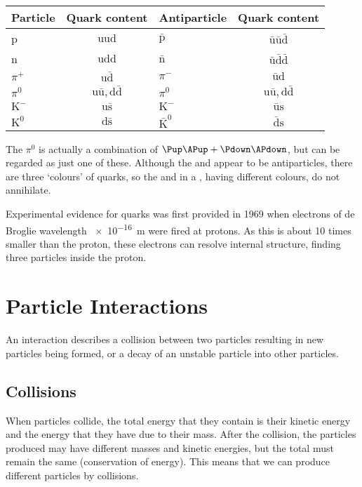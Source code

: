 \documentclass[a4paper,12pt]{article}
\begin{document}
\noindent \begin{tabular}{lclc}
\hline
\hline
Particle & Quark content & Antiparticle & Quark content \\
\hline
p & $\mathrm{u}\mathrm{u}\mathrm{d}$ & $\bar{\mathrm{p}}$ & $\bar{\mathrm{u}}\bar{\mathrm{u}}\bar{\mathrm{d}}$ \\
n & $\mathrm{u}\mathrm{d}\mathrm{d}$ & $\bar{\mathrm{n}}$ & $\bar{\mathrm{u}}\bar{\mathrm{d}}\bar{\mathrm{d}}$ \\
$\pi^{+}$ & $\mathrm{u}\bar{\mathrm{d}}$ & $\pi^{-}$ & $\bar{\mathrm{u}}\mathrm{d}$ \\
$\pi^{0}$ & $\mathrm{u}\bar{\mathrm{u}},\mathrm{d}\bar{\mathrm{d}}$ & $\pi^{0}$ & $\mathrm{u}\bar{\mathrm{u}},\mathrm{d}\bar{\mathrm{d}}$ \\
$\mathrm{K}^{-}$ & $\mathrm{u}\bar{\mathrm{s}}$ & $\mathrm{K}^{-}$ & $\bar{\mathrm{u}}\mathrm{s}$ \\
$\mathrm{K}^{0}$ & $\mathrm{d}\bar{\mathrm{s}}$ & $\bar{\mathrm{K}}^{0}$ & $\bar{\mathrm{d}}\mathrm{s}$ \\
\hline
\hline
\end{tabular}

The $\pi^{0}$ is actually a combination of $\Pup\APup+\Pdown\APdown$, but can be regarded as just one of these.  Although the \Pup and \APup appear to be antiparticles, there are three `colours' of quarks, so the \Pup and \APup in a \Ppizero, having different colours, do not annihilate.

Experimental evidence for quarks was first provided in 1969 when electrons of de Broglie wavelength \SI{e-16}{m} were fired at protons.  As this is about 10 times smaller than the proton, these electrons can resolve internal structure, finding three particles inside the proton.

\section{Particle Interactions}

An interaction describes a collision between two particles resulting in new particles being formed, or a decay of an unstable particle into other particles.  

\subsection{Collisions}

When particles collide, the total energy that they contain is their kinetic energy and the energy that they have due to their mass.  After the collision, the particles produced may have different masses and kinetic energies, but the total must remain the same (conservation of energy).  This means that we can produce different particles by collisions.
\end{document}
